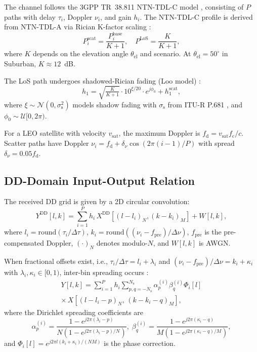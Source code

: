 ﻿\documentclass[conference]{IEEEtran}
\begin{document}
The channel follows the 3GPP TR~38.811 NTN-TDL-C model \cite{3gpp_38811}, consisting of $P$ paths with delay $\tau_i$, Doppler $\nu_i$, and gain $h_i$. The NTN-TDL-C profile is derived from NTN-TDL-A via Rician K-factor scaling \cite{3gpp_38901}:
\begin{equation}\label{eq:kfactor}
  P_i^{\mathrm{scat}} = \frac{P_i^{\mathrm{base}}}{K + 1}, \quad
  P^{\mathrm{LoS}} = \frac{K}{K + 1},
\end{equation}
where $K$ depends on the elevation angle $\theta_{\mathrm{el}}$ and scenario. At $\theta_{\mathrm{el}} = 50^\circ$ in Suburban, $K \approx 12$~dB.

The LoS path undergoes shadowed-Rician fading (Loo model) \cite{loo_model}:
\begin{equation}\label{eq:los_fading}
  h_1 = \sqrt{\tfrac{K}{K+1}} \cdot 10^{\xi/20} \cdot e^{j\phi_0} + h_1^{\mathrm{scat}},
\end{equation}
where $\xi \sim \mathcal{N}(0, \sigma_{\mathrm{s}}^2)$ models shadow fading with $\sigma_{\mathrm{s}}$ from ITU-R P.681 \cite{itu_p681}, and $\phi_0 \sim \mathcal{U}[0, 2\pi)$.

For a LEO satellite with velocity $v_{\mathrm{sat}}$, the maximum Doppler is $f_{\mathrm{d}} = v_{\mathrm{sat}} f_{\mathrm{c}} / c$. Scatter paths have Doppler $\nu_i = f_{\mathrm{d}} + \delta_\nu \cos(2\pi(i\!-\!1)/P)$ with spread $\delta_\nu = 0.05 f_{\mathrm{d}}$.

\subsection{DD-Domain Input-Output Relation}

The received DD grid is given by a 2D circular convolution:
\begin{equation}\label{eq:dd_io}
  Y^{\mathrm{DD}}[l,k] \!=\! \sum_{i=1}^{P} h_i\, X^{\mathrm{DD}}\!\left[(l \!-\! l_i)_N, (k \!-\! k_i)_M \right] + W[l,k],
\end{equation}
where $l_i = \mathrm{round}(\tau_i / \Delta\tau)$, $k_i = \mathrm{round}((\nu_i - f_{\mathrm{pre}}) / \Delta\nu)$, $f_{\mathrm{pre}}$ is the pre-compensated Doppler, $(\cdot)_N$ denotes modulo-$N$, and $W[l,k]$ is AWGN.

When fractional offsets exist, i.e., $\tau_i/\Delta\tau = l_i + \lambda_i$ and $(\nu_i - f_{\mathrm{pre}})/\Delta\nu = k_i + \kappa_i$ with $\lambda_i, \kappa_i \in [0,1)$, inter-bin spreading occurs \cite{raviteja2019}:
\begin{multline}\label{eq:dd_frac}
  Y[l,k] = \sum_{i=1}^{P} h_i \!\!\sum_{p,q=-N_{\mathrm{s}}}^{N_{\mathrm{s}}} \alpha_p^{(i)} \beta_q^{(i)} \Phi_i[l] \\
  \times\, X\!\left[(l\!-\!l_i\!-\!p)_N,\, (k\!-\!k_i\!-\!q)_M\right],
\end{multline}
where the Dirichlet spreading coefficients are
\begin{equation}\label{eq:spreading}
  \alpha_p^{(i)} \!=\! \frac{1\!-\!e^{j2\pi(\lambda_i - p)}}{N(1\!-\!e^{j2\pi(\lambda_i - p)/N})},\;
  \beta_q^{(i)} \!=\! \frac{1\!-\!e^{j2\pi(\kappa_i - q)}}{M(1\!-\!e^{j2\pi(\kappa_i - q)/M})},
\end{equation}
and $\Phi_i[l] = e^{j2\pi l(k_i + \kappa_i)/(NM)}$ is the phase correction.
\end{document}
